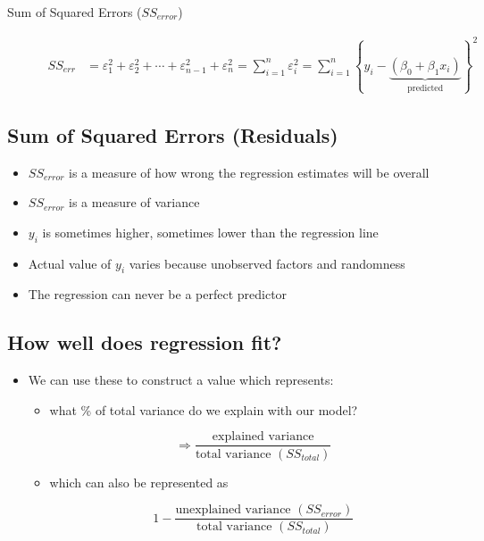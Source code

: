 \documentclass[10pt,article]{article}
\begin{document}
\begin{description}
\item[{Sum of Squared Errors (\(SS_{error}\))}] \quad

\iffalse
\[ \begin{aligned}
      SS_{err} &= \varepsilon^2_1 + \varepsilon^2_2 + \cdots +
                   \varepsilon^2_{n-1} + \varepsilon^2_{n} = \sum_{i=1}^n \varepsilon^2_i 
   \end{aligned} \]

\[ = \sum_{i=1}^n \left\{ y_i - \underbrace{(\beta_0 + \beta_1 x_{i})}_{\text{predicted}} \right\}^2 \]
\fi

\[ \begin{aligned}
      SS_{err} &= \varepsilon^2_1 + \varepsilon^2_2 + \cdots +
                   \varepsilon^2_{n-1} + \varepsilon^2_{n} = \sum_{i=1}^n \varepsilon^2_i 
      = \sum_{i=1}^n \left\{ y_i - \underbrace{(\beta_0 + \beta_1 x_{i})}_{\text{predicted}} \right\}^2
   \end{aligned} \]
\end{description}
\subsection{Sum of Squared Errors (Residuals)}
\label{sec:orgaf2d2a6}
\begin{itemize}
\item \(SS_{error}\) is a measure of how wrong the regression estimates will be
overall
\item \(SS_{error}\) is a measure of variance
\item \(y_i\) is sometimes higher, sometimes lower than the regression line
\item Actual value of \(y_i\) varies because unobserved factors and randomness
\item The regression can never be a perfect predictor
\end{itemize}
\subsection{How well does regression fit?}
\label{sec:org0551e7c}
\begin{itemize}
\item We can use these to construct a value which represents:

\begin{itemize}
\item what \% of total variance do we explain with our model?

\[ \Rightarrow \dfrac{\text{explained variance}}
       {\text{total variance } (SS_{total})}
    \]

\item which can also be represented as

\[
       1 - \dfrac{\text{unexplained variance } (SS_{error})}
       {\text{total variance } (SS_{total})}
    \]
\end{itemize}
\end{itemize}
\end{document}
